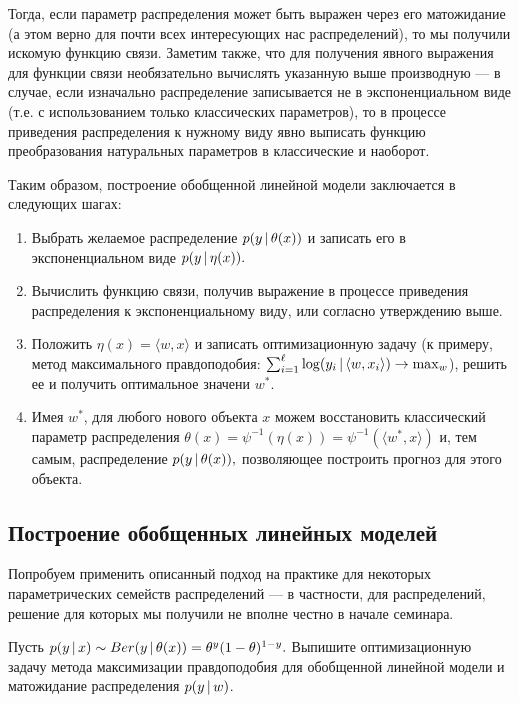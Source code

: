 \documentclass[12pt,a4paper]{article}
\begin{document}
    Тогда, если параметр распределения может быть выражен через его матожидание (а этом верно для почти всех интересующих нас распределений), то мы получили искомую функцию связи. Заметим также, что для получения явного выражения для функции связи необязательно вычислять указанную выше производную — в случае, если изначально распределение записывается не в экспоненциальном виде (т.е. с использованием только классических параметров), то в процессе приведения распределения к нужному виду явно выписать функцию преобразования натуральных параметров в классические и наоборот.
    \par Таким образом, построение обобщенной линейной модели заключается в следующих шагах:
    \begin{enumerate}
        \item Выбрать желаемое распределение $p(y \mspace{3mu}{|}\mspace{3mu} \theta(x))$ и записать его в экспоненциальном виде $p(y \mspace{3mu}{|}\mspace{3mu} \eta(x)).$
        \item Вычислить функцию связи, получив выражение в процессе приведения распределения к экспоненциальному виду, или согласно утверждению выше.
        \item Положить $\eta(x) = \langle w, x \rangle$ и записать оптимизационную задачу (к примеру, метод максимального правдоподобия: $\sum_{i=1}^\ell \log (y_i \mspace{3mu}{|}\mspace{3mu} \langle w, x_i \rangle) \to \max_w$), решить ее и получить оптимальное значени $w^*$.
        \item Имея $w^*$, для любого нового объекта $x$ можем восстановить классический параметр распределения $\theta(x) = \psi^{-1} (\eta(x)) = \psi^{-1} (\langle w^*, x \rangle)$ и, тем самым, распределение $p(y \mspace{3mu}{|}\mspace{3mu} \theta(x)),$ позволяющее построить прогноз для этого объекта.
    \end{enumerate}
    
    \subsection{Построение обобщенных линейных моделей}
    \par Попробуем применить описанный подход на практике для некоторых параметрических семейств распределений — в частности, для распределений, решение для которых мы получили не вполне честно в начале семинара.
    \newpage 
    \begin{vkProblem}
        Пусть $p(y \mspace{3mu}{|}\mspace{3mu} x) \sim Ber (y \mspace{3mu}{|}\mspace{3mu} \theta(x)) = \theta^y (1 - \theta)^{1- y}.$ Выпишите оптимизационную задачу метода максимизации правдоподобия для обобщенной линейной модели и матожидание распределения $p(y \mspace{3mu}{|}\mspace{3mu} w)$.
    \end{vkProblem} 
    
\end{document}

